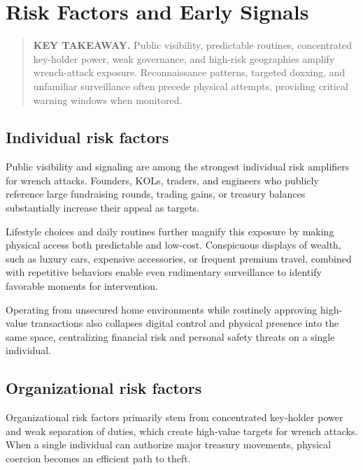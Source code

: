 \chapter{Risk Factors and Early Signals}\label{risk-factors-and-early-signals}

\begin{quote}
\textbf{KEY TAKEAWAY.} Public visibility, predictable routines, concentrated key-holder power, weak governance, and high-risk geographies amplify wrench-attack exposure. Reconnaissance patterns, targeted doxxing, and unfamiliar surveillance often precede physical attempts, providing critical warning windows when monitored.
\end{quote}

\section{Individual risk factors}\label{individual-risk-factors}

Public visibility and signaling are among the strongest individual risk amplifiers for wrench attacks. Founders, KOLs, traders, and engineers who publicly reference large fundraising rounds, trading gains, or treasury balances substantially increase their appeal as targets.

Lifestyle choices and daily routines further magnify this exposure by making physical access both predictable and low-cost. Conspicuous displays of wealth, such as luxury cars, expensive accessories, or frequent premium travel, combined with repetitive behaviors enable even rudimentary surveillance to identify favorable moments for intervention.

Operating from unsecured home environments while routinely approving high-value transactions also collapses digital control and physical presence into the same space, centralizing financial risk and personal safety threats on a single individual.

\section{Organizational risk factors}\label{organizational-risk-factors}

Organizational risk factors primarily stem from concentrated key-holder power and weak separation of duties, which create high-value targets for wrench attacks. When a single individual can authorize major treasury movements, physical coercion becomes an efficient path to theft.

